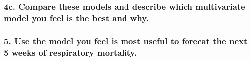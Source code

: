 \documentclass[]{article}
\begin{document}
\subsubsection{4c. Compare these models and describe which multivariate
model you feel is the best and
why.}\label{c.-compare-these-models-and-describe-which-multivariate-model-you-feel-is-the-best-and-why.}

\subsubsection{5. Use the model you feel is most useful to forecat the
next 5 weeks of respiratory
mortality.}\label{use-the-model-you-feel-is-most-useful-to-forecat-the-next-5-weeks-of-respiratory-mortality.}
\end{document}
